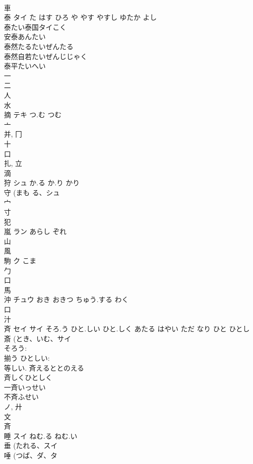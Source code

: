 \documentclass[8pt]{extreport}
\begin{document}
\begin{CJK}{UTF8}{min}
\\	車 
\\	泰	タイ	た はす ひろ や やす やすし ゆたか よし	
\\	泰たい泰国タイこく
\\	安泰あんたい
\\	泰然たるたいぜんたる
\\	泰然自若たいぜんじじゃく
\\	泰平たいへい
\\	一 
\\	二 
\\	人 
\\	水 
\\	摘	テキ	つ.む つむ	
\\	亠 
\\	并, 冂 
\\	十 
\\	口 
\\	扎, 立 
\\	滴 
\\	狩	シュ	か.る か.り かり	
\\	守 (まも る、シュ 
\\	宀 
\\	寸 
\\	犯 
\\	嵐	ラン	あらし ぞれ	
\\	山 
\\	風 
\\	駒	ク	こま	
\\	勹 
\\	口 
\\	馬 
\\	沖	チュウ	おき おきつ ちゅう.する わく	
\\	口 
\\	汁 
\\	斉	セイ サイ	そろ.う ひと.しい ひと.しく あたる はやい ただ なり ひと ひとし	
\\	斎 (とき、いむ、サイ 
\\	そろう: 
\\	揃う ひとしい: 
\\	等しい.		斉えるととのえる
\\	斉しくひとしく
\\	一斉いっせい
\\	不斉ふせい
\\	ノ, 廾 
\\	文 
\\	斉 
\\	睡	スイ	ねむ.る ねむ.い	
\\	垂 (たれる、スイ 
\\	唾 (つば、ダ、タ 

\end{CJK}
\end{document}
